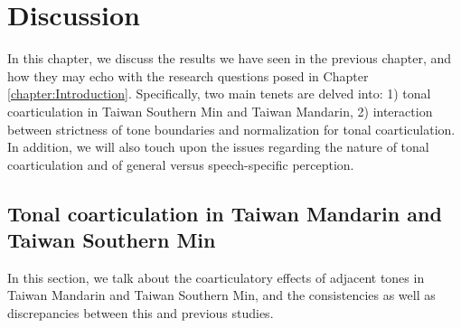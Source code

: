 
\chapter{Discussion}

In this chapter, we discuss the results we have seen in the previous chapter, and how they may echo with the research questions posed in Chapter \ref{chapter:Introduction}. Specifically, two main tenets are delved into: 1) tonal coarticulation in Taiwan Southern Min and Taiwan Mandarin, 2) interaction between strictness of tone boundaries and normalization for tonal coarticulation. In addition, we will also touch upon the issues regarding the nature of tonal coarticulation and of general versus speech-specific perception.

\section{Tonal coarticulation in Taiwan Mandarin and Taiwan Southern Min}

In this section, we talk about the coarticulatory effects of adjacent tones in Taiwan Mandarin and Taiwan Southern Min, and the consistencies as well as discrepancies between this and previous studies.

